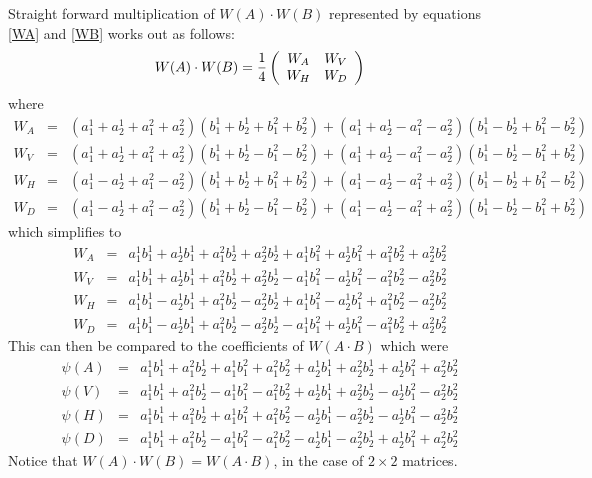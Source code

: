 Straight forward multiplication of $W(A) \cdot W(B)$ represented by equations \ref{WA} and \ref{WB} works out as follows:
\[
W(A) \cdot W(B) = 
{1 \over 4} 
\left(
\begin{array}{cc}
W_A & W_V \\
W_H & W_D
\end{array}
\right)
\]
where
\begin{eqnarray*}
W_A &=& (a^1_1 + a^1_2 + a^2_1 + a^2_2)( b^1_1 + b^1_2 + b^2_1 + b^2_2) + ( a^1_1 + a^1_2 - a^2_1 - a^2_2)(b^1_1 - b^1_2 + b^2_1 - b^2_2) \\
W_V &=& ( a^1_1 + a^1_2 + a^2_1 + a^2_2) ( b^1_1 + b^1_2 - b^2_1 - b^2_2) + (a^1_1 + a^1_2 - a^2_1 - a^2_2) ( b^1_1 - b^1_2 - b^2_1 + b^2_2)  \\
W_H &=&  ( a^1_1 - a^1_2 + a^2_1 - a^2_2)(b^1_1 + b^1_2 + b^2_1 + b^2_2) +  ( a^1_1 - a^1_2 - a^2_1 + a^2_2 ) (b^1_1 - b^1_2 + b^2_1 - b^2_2) \\
W_D &=& ( a^1_1 - a^1_2 + a^2_1 - a^2_2) (b^1_1 + b^1_2 - b^2_1 - b^2_2)+( a^1_1 - a^1_2 - a^2_1 + a^2_2 )(b^1_1 - b^1_2 - b^2_1 + b^2_2)
\end{eqnarray*}
which simplifies to
\begin{eqnarray*}
W_A &=& a^1_1 b^1_1 + a^1_2 b^1_1 + a^2_1 b^1_2 + a^2_2 b^1_2 + a^1_1 b^2_1 + a^1_2 b^2_1 + a^2_1 b^2_2 + a^2_2 b^2_2 \\
W_V &=& a^1_1 b^1_1 + a^1_2 b^1_1 + a^2_1 b^1_2 + a^2_2 b^1_2 - a^1_1 b^2_1 - a^1_2 b^2_1 - a^2_1 b^2_2 - a^2_2 b^2_2 \\
W_H &=& a^1_1 b^1_1 - a^1_2 b^1_1 + a^2_1 b^1_2 - a^2_2 b^1_2 + a^1_1 b^2_1 - a^1_2 b^2_1 + a^2_1 b^2_2 - a^2_2 b^2_2 \\
W_D &=& a^1_1 b^1_1 - a^1_2 b^1_1 + a^2_1 b^1_2 - a^2_2 b^1_2 - a^1_1 b^2_1 + a^1_2 b^2_1 - a^2_1 b^2_2 + a^2_2 b^2_2 
\end{eqnarray*}
This can then be compared to the coefficients of $W(A \cdot B)$ which were
\begin{eqnarray*}
\psi(A) &=& a^1_1 b^1_1 + a^2_1 b^1_2 + a^1_1b^2_1 + a^2_1  b^2_2 + a^1_2 b^1_1 + a^2_2 b^1_2 + a^1_2 b^2_1 + a^2_2 b^2_2 \\
\psi(V) &=& a^1_1 b^1_1 + a^2_1 b^1_2  - a^1_1b^2_1 - a^2_1  b^2_2 +  a^1_2 b^1_1 + a^2_2 b^1_2 - a^1_2 b^2_1 - a^2_2 b^2_2 \\
\psi(H) &=& a^1_1 b^1_1 + a^2_1 b^1_2 + a^1_1b^2_1 + a^2_1  b^2_2 - a^1_2 b^1_1 - a^2_2 b^1_2 - a^1_2 b^2_1 - a^2_2 b^2_2 \\
\psi(D) &=& a^1_1 b^1_1 + a^2_1 b^1_2  - a^1_1b^2_1 - a^2_1  b^2_2 -a^1_2 b^1_1 - a^2_2 b^1_2 + a^1_2 b^2_1 + a^2_2 b^2_2  
\end{eqnarray*}
Notice that $W(A) \cdot W(B) = W(A \cdot B) $,  in the case of $2 \times 2$ matrices.

